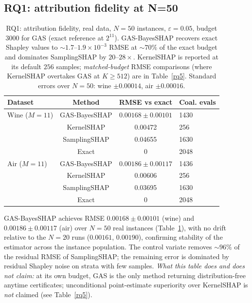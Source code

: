 \documentclass[11pt,twocolumn]{article}
\begin{document}
\subsection{RQ1: attribution fidelity at N=50}\label{sec:rq1}
\begin{table}[t]\centering\small
\begin{tabular}{lccl}
\toprule
Dataset & Method & RMSE vs exact & Coal. evals \\
\midrule
Wine ($M{=}11$) & GAS-BayesSHAP & $\mathbf{0.00168\pm0.00101}$ & 1430 \\
& KernelSHAP & 0.00472 & 256 \\
& SamplingSHAP & 0.04655 & 1630 \\
& Exact & 0 & 2048 \\
\addlinespace
Air ($M{=}11$) & GAS-BayesSHAP & $\mathbf{0.00186\pm0.00117}$ & 1436 \\
& KernelSHAP & 0.00606 & 256 \\
& SamplingSHAP & 0.03695 & 1630 \\
& Exact & 0 & 2048 \\
\bottomrule
\end{tabular}
\caption{RQ1: attribution fidelity, real data, $N=50$ instances,
$\varepsilon{=}0.05$, budget $3000$ for GAS (exact reference at $2^{11}$).
GAS-BayesSHAP recovers exact Shapley values to
$\sim\!1.7$--$1.9\times10^{-3}$ RMSE at $\sim\!70\%$ of the exact budget and
dominates SamplingSHAP by $20$--$28\times$.  KernelSHAP is reported at its
default $256$ samples; \emph{matched-budget} RMSE comparisons (where
KernelSHAP overtakes GAS at $K\ge512$) are in Table~\ref{rq5}.  Standard
errors over $N=50$: wine $\pm0.00014$, air $\pm0.00016$.}
\label{rq1}
\end{table}

GAS-BayesSHAP achieves RMSE $0.00168\pm0.00101$ (wine) and
$0.00186\pm0.00117$ (air) over $N=50$ real instances (Table~\ref{rq1}), with
no drift relative to the $N=20$ runs ($0.00161$, $0.00190$), confirming
stability of the estimator across the instance population.  The control
variate removes $\sim\!96\%$ of the residual RMSE of SamplingSHAP; the
remaining error is dominated by residual Shapley noise on strata with few
samples.  \emph{What this table does and does not claim:} at its own
budget, GAS is the only method returning distribution-free anytime
certificates; unconditional point-estimate superiority over KernelSHAP is
\emph{not} claimed (see Table~\ref{rq5}).
\end{document}
